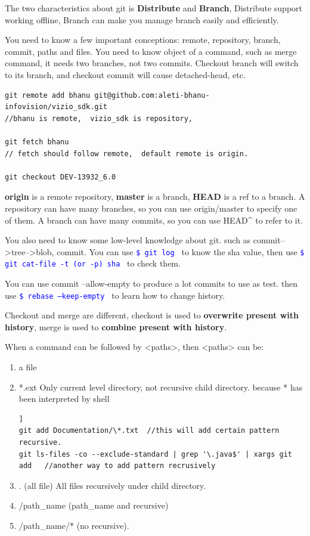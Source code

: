 \documentclass[paper=8.5in:11in, twoside, 12pt, pagesize=pdftex]{book}
\newcommand{\linuxcommand}[1]{\texttt{\textcolor{blue}{\$ #1 \Pisymbol{psy}{191}}}}
\begin{document}
	The two characteristics about git is \textbf{Distribute} and \textbf{Branch}, Distribute support working offline, Branch can make you manage branch easily and efficiently.
	
	You need to know a few important conceptions: remote, repository, branch, commit, paths and files. You need to know object of a command, such as merge command, it needs two branches, not two commits. Checkout branch will switch to its branch, and checkout commit will cause detached-head, etc.  
	
\begin{lstlisting}
git remote add bhanu git@github.com:aleti-bhanu-infovision/vizio_sdk.git
//bhanu is remote,  vizio_sdk is repository, 

git fetch bhanu
// fetch should follow remote,  default remote is origin.

git checkout DEV-13932_6.0	
\end{lstlisting}

	
	\textbf{origin} is a remote repository, \textbf{master} is a branch, \textbf{HEAD} is a ref to a branch. A repository can have many branches, so you can use origin/master to specify one of them. A branch can have many commits, so you can use HEAD\^{} to refer to it.
	
	You also need to know some low-level knowledge about git. such as commit-->tree-->blob,  commit. You can use \linuxcommand{git log} to know the sha value, then use \linuxcommand{git cat-file -t (or -p) sha} to check them. 
	
	You can use commit --allow-empty to produce a lot commits to use as test. then use \linuxcommand{rebase --keep-empty } to learn how to change history. 
	
	Checkout and merge are different, checkout is used to \textbf{overwrite present with history}, merge is used to \textbf{combine present with history}.  
	
	When a command can be followed by <paths>, then <paths> can be:
	\begin{enumerate}
		\item a file
		 
		\item *.ext  Only current level directory, not recursive child directory. because * has been interpreted by shell

\begin{lstlisting}[mathescape=false]]
git add Documentation/\*.txt  //this will add certain pattern recursive.
git ls-files -co --exclude-standard | grep '\.java$' | xargs git add   //another way to add pattern recrusively
\end{lstlisting}

			
		\item . (all file) All files recursively under child directory.
		\item /path\_name   (path\_name and recursive) 
		\item /path\_name/* (no recursive). 
	\end{enumerate}
	
\end{document}
